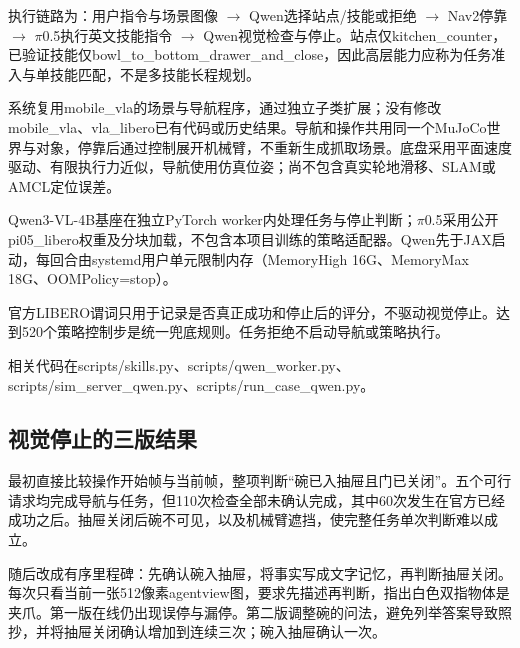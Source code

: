 执行链路为：用户指令与场景图像 \(\rightarrow\) Qwen选择站点/技能或拒绝 \(\rightarrow\) Nav2停靠 \(\rightarrow\) \(\pi\)0.5执行英文技能指令 \(\rightarrow\) Qwen视觉检查与停止。站点仅kitchen\_counter，已验证技能仅bowl\_to\_bottom\_drawer\_and\_close，因此高层能力应称为任务准入与单技能匹配，不是多技能长程规划。

系统复用mobile\_vla的场景与导航程序，通过独立子类扩展；没有修改mobile\_vla、vla\_libero已有代码或历史结果。导航和操作共用同一个MuJoCo世界与对象，停靠后通过控制展开机械臂，不重新生成抓取场景。底盘采用平面速度驱动、有限执行力近似，导航使用仿真位姿；尚不包含真实轮地滑移、SLAM或AMCL定位误差。

Qwen3-VL-4B基座在独立PyTorch worker内处理任务与停止判断；\(\pi\)0.5采用公开pi05\_libero权重及分块加载，不包含本项目训练的策略适配器。Qwen先于JAX启动，每回合由systemd用户单元限制内存（MemoryHigh 16G、MemoryMax 18G、OOMPolicy=stop）。

官方LIBERO谓词只用于记录是否真正成功和停止后的评分，不驱动视觉停止。达到520个策略控制步是统一兜底规则。任务拒绝不启动导航或策略执行。

相关代码在scripts/skills.py、scripts/qwen\_worker.py、scripts/sim\_server\_qwen.py、scripts/run\_case\_qwen.py。

\subsection{视觉停止的三版结果}\label{s16-detail-2}

最初直接比较操作开始帧与当前帧，整项判断``碗已入抽屉且门已关闭''。五个可行请求均完成导航与任务，但110次检查全部未确认完成，其中60次发生在官方已经成功之后。抽屉关闭后碗不可见，以及机械臂遮挡，使完整任务单次判断难以成立。

随后改成有序里程碑：先确认碗入抽屉，将事实写成文字记忆，再判断抽屉关闭。每次只看当前一张512像素agentview图，要求先描述再判断，指出白色双指物体是夹爪。第一版在线仍出现误停与漏停。第二版调整碗的问法，避免列举答案导致照抄，并将抽屉关闭确认增加到连续三次；碗入抽屉确认一次。

